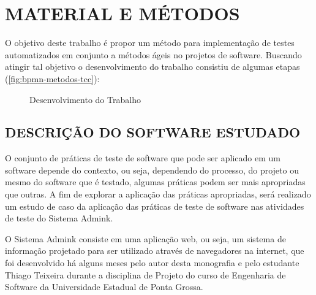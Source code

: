 
\chapter{MATERIAL E MÉTODOS}
\label{chap:metodologia}

O objetivo deste trabalho é propor um método para implementação de testes automatizados em conjunto a métodos ágeis no projetos de software. Buscando atingir tal objetivo o desenvolvimento do trabalho consistiu de algumas etapas (\autoref{fig:bpmn-metodos-tcc}):

    \begin{figure}[!htb]
        \centering
    	\begin{minipage}{\wd0}
	    	\caption{Desenvolvimento do Trabalho}
	    	\label{fig:bpmn-metodos-tcc}
	    \end{minipage}
    \end{figure}

   \section{DESCRIÇÃO DO SOFTWARE ESTUDADO}
    O conjunto de práticas de teste de software que pode ser aplicado em um software depende do contexto, ou seja, dependendo do processo, do projeto ou mesmo do software que é testado, algumas práticas podem ser mais apropriadas que outras. A fim de explorar a aplicação das práticas apropriadas, será realizado um estudo de caso da aplicação das práticas de teste de software nas atividades de teste do Sistema Admink.

    O Sistema Admink consiste em uma aplicação web, ou seja, um sistema de informação projetado para ser utilizado através de navegadores na internet, que foi desenvolvido há alguns meses pelo autor desta monografia e pelo estudante Thiago Teixeira durante a disciplina de Projeto do curso de Engenharia de Software da Universidade Estadual de Ponta Grossa.

